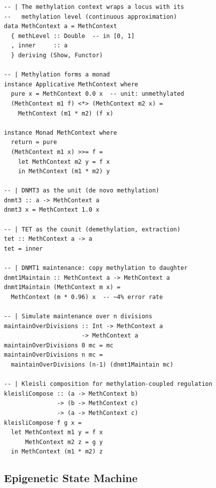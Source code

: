 \documentclass[12pt,a4paper]{article}
\begin{document}
\begin{lstlisting}[caption={Methylation monad implementation}]
-- | The methylation context wraps a locus with its
--   methylation level (continuous approximation)
data MethContext a = MethContext
  { methLevel :: Double  -- in [0, 1]
  , inner     :: a
  } deriving (Show, Functor)

-- | Methylation forms a monad
instance Applicative MethContext where
  pure x = MethContext 0.0 x  -- unit: unmethylated
  (MethContext m1 f) <*> (MethContext m2 x) =
    MethContext (m1 * m2) (f x)

instance Monad MethContext where
  return = pure
  (MethContext m1 x) >>= f =
    let MethContext m2 y = f x
    in MethContext (m1 * m2) y

-- | DNMT3 as the unit (de novo methylation)
dnmt3 :: a -> MethContext a
dnmt3 x = MethContext 1.0 x

-- | TET as the counit (demethylation, extraction)
tet :: MethContext a -> a
tet = inner

-- | DNMT1 maintenance: copy methylation to daughter
dnmt1Maintain :: MethContext a -> MethContext a
dnmt1Maintain (MethContext m x) =
  MethContext (m * 0.96) x  -- ~4% error rate

-- | Simulate maintenance over n divisions
maintainOverDivisions :: Int -> MethContext a
                      -> MethContext a
maintainOverDivisions 0 mc = mc
maintainOverDivisions n mc =
  maintainOverDivisions (n-1) (dnmt1Maintain mc)

-- | Kleisli composition for methylation-coupled regulation
kleisliCompose :: (a -> MethContext b)
               -> (b -> MethContext c)
               -> (a -> MethContext c)
kleisliCompose f g x =
  let MethContext m1 y = f x
      MethContext m2 z = g y
  in MethContext (m1 * m2) z
\end{lstlisting}

\subsection{Epigenetic State Machine}
\end{document}
